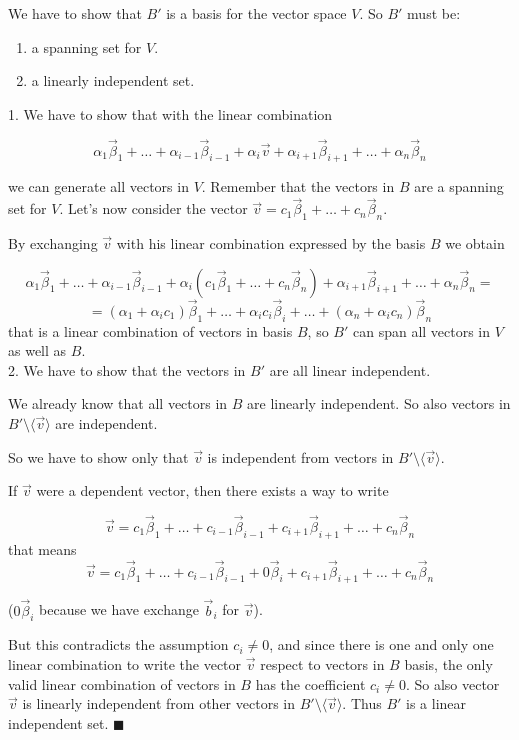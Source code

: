 \begin{tcolorbox}[colback=def_color,coltitle=black,coltext=black,colframe=pro_color_back,title=\textbf{Proof}]

We have to show that $B'$ is a basis for the vector space $V$. So $B'$ must be:

\begin{enumerate}
    \item a spanning set for $V$.
    \item a linearly independent set.
\end{enumerate}

1. We have to show that with the linear combination 

$$
\alpha_1 \vec \beta_1 + \dots + \alpha_{i-1} \vec \beta_{i-1} + \alpha_i \vec v + \alpha_{i+1} \vec \beta_{i+1} + \dots + \alpha_n \vec \beta_n
$$

we can generate all vectors in $V$. Remember that the vectors in $B$ are a spanning set for $V$. Let's now consider the vector $\vec v = c_1 \vec \beta_1 + \dots + c_n \vec \beta_n$.

By exchanging $\vec v$ with his linear combination expressed by the basis $B$ we obtain

$$
\alpha_1 \vec \beta_1 + \dots + \alpha_{i-1} \vec \beta_{i-1} + \alpha_i (c_1 \vec \beta_1 + \dots + c_n \vec \beta_n) + \alpha_{i+1} \vec \beta_{i+1} + \dots + \alpha_n \vec \beta_n =
$$
$$
= (\alpha_1 + \alpha_i c_1) \vec \beta_1 + \dots + \alpha_i c_i \vec \beta_i + \dots + (\alpha_n + \alpha_i c_n) \vec \beta_n
$$
that is a linear combination of vectors in basis $B$, so $B'$ can span all vectors in $V$ as well as $B$.
\\

2. We have to show that the vectors in $B'$ are all linear independent.

We already know that all vectors in $B$ are linearly independent. So also vectors in $B' \setminus \langle\vec v\rangle$ are independent.

So we have to show only that $\vec v$ is independent from vectors in $B' \setminus \langle\vec v\rangle$.

If $\vec v$ were a dependent vector, then there exists a way to write

$$
\vec v = c_1 \vec \beta_1 + \dots + c_{i-1} \vec \beta_{i-1} + c_{i+1} \vec \beta_{i+1} + \dots + c_n \vec \beta_n
$$
that means
$$
\vec v = c_1 \vec \beta_1 + \dots + c_{i-1} \vec \beta_{i-1} + 0 \vec \beta_i + c_{i+1} \vec \beta_{i+1} + \dots + c_n \vec \beta_n
$$

($0 \vec \beta_i$ because we have exchange $\vec b_i$ for $\vec v$).

But this contradicts the assumption $c_i \neq 0$, and since there is one and only one linear combination to write the vector $\vec v$ respect to vectors in $B$ basis, the only valid linear combination of vectors in $B$ has the coefficient $c_i \neq 0$. So also vector $\vec v$ is linearly
independent from other vectors in $B' \setminus \langle\vec v\rangle$. Thus $B'$ is a linear independent set. $\blacksquare$
\end{tcolorbox}

